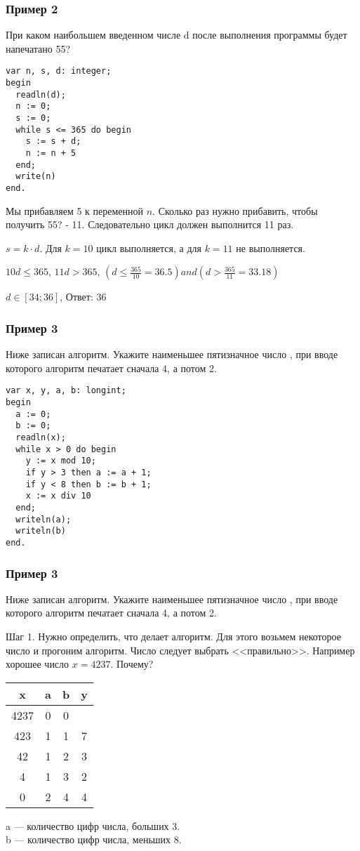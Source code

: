 \begin{frame}[fragile]
\frametitle{Пример 2}

При каком наибольшем введенном числе d после выполнения программы будет напечатано 55?
\begin{multicols}{2}
\begin{lstlisting}[style=CStyle]
var n, s, d: integer;
begin
  readln(d);
  n := 0;
  s := 0;
  while s <= 365 do begin
    s := s + d;
    n := n + 5
  end;
  write(n)
end.
\end{lstlisting}
\columnbreak
\small
Мы прибавляем 5 к переменной $n$. Сколько раз нужно прибавить, чтобы получить 55? - 11.
Следовательно цикл должен выполнится 11 раз.

$s=k\cdot d$. Для $k=10$ цикл выполняется, а для $k=11$ не выполняется.

$10d\leq 365$, $11d>365$, $(d\leq \frac{365}{10}=36.5)and(d>\frac{365}{11}=33.18)$

$d\in[34;36]$, Ответ: 36
\end{multicols}


    
\end{frame}

\begin{frame}[fragile]
\frametitle{Пример 3}
Ниже записан алгоритм. Укажите наименьшее пятизначное число  , при вводе которого алгоритм печатает сначала 4, а потом 2.
\begin{lstlisting}[style=CStyle]
var x, y, a, b: longint;
begin
  a := 0;
  b := 0;
  readln(x);
  while x > 0 do begin
    y := x mod 10;
    if y > 3 then a := a + 1;
    if y < 8 then b := b + 1;
    x := x div 10
  end;
  writeln(a);
  writeln(b)
end.
\end{lstlisting}
\end{frame}

\begin{frame}[fragile]
\frametitle{Пример 3}
Ниже записан алгоритм. Укажите наименьшее пятизначное число  , при вводе которого алгоритм печатает сначала 4, а потом 2.

Шаг 1. Нужно определить, что делает алгоритм. Для этого возьмем некоторое число и прогоним алгоритм.
Число следует выбрать <<правильно>>. Например хорошее число $x=4237$. Почему?
\begin{multicols}{2}
\begin{tabular}{|c|c|c|c|}
\hline 
x & a & b & y\tabularnewline
\hline 
\hline 
4237 & 0 & 0 & \tabularnewline
\hline 
423 & 1 & 1 & 7\tabularnewline
\hline 
42 & 1 & 2 & 3\tabularnewline
\hline 
4 & 1 & 3 & 2\tabularnewline
\hline 
0 & 2 & 4 & 4\tabularnewline
\hline 
\end{tabular}
\columnbreak

a --- количество цифр числа, больших 3.\\
b --- количество цифр числа, меньших 8.

\end{multicols}



\end{frame}

